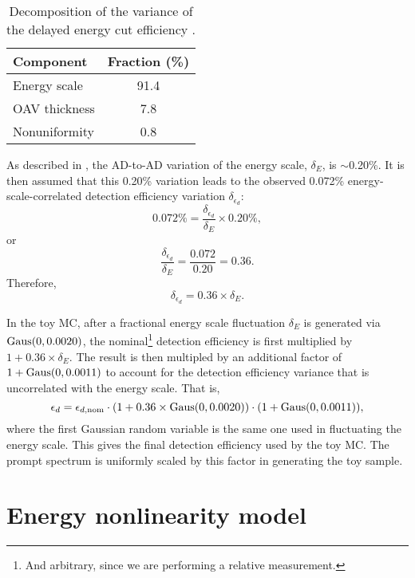 \documentclass[../thesis.tex]{subfiles}
\begin{document}
\begin{table}[ht]
  \begin{tabular}{lc}
    \toprule
    Component & Fraction (\%) \\
    \midrule
    Energy scale & 91.4 \\
    OAV thickness & 7.8 \\
    Nonuniformity & 0.8 \\
    \bottomrule
  \end{tabular}
  \caption{Decomposition of the variance of the delayed energy cut efficiency \cite{loganDetEff}.}
  \label{tab:delayedEffVariance}
\end{table}

As described in \cite[Sec.\@ III B 5 b]{An_2017}, the AD-to-AD variation of the energy scale, $\delta_E$, is $\sim$0.20\%. It is then assumed that this 0.20\% variation leads to the observed 0.072\% energy-scale-correlated detection efficiency variation $\delta_{\epsilon_d}$:
\begin{equation}
  0.072\% = \frac{\delta_{\epsilon_d}}{\delta_E} \times 0.20\%,
\end{equation}
or
\begin{equation}
  \frac{\delta_{\epsilon_d}}{\delta_E} = \frac{0.072}{0.20} = 0.36.
\end{equation}
Therefore,
\begin{equation}
  \delta_{\epsilon_d} = 0.36 \times \delta_E.
\end{equation}

In the toy MC, after a fractional energy scale fluctuation $\delta_E$ is generated via $\operatorname{Gaus}(0, 0.0020)$, the nominal\footnote{And arbitrary, since we are performing a relative measurement.} detection efficiency is first multiplied by $1 + 0.36 \times \delta_E$. The result is then multipled by an additional factor of $1 + \operatorname{Gaus}(0, 0.0011)$ to account for the detection efficiency variance that is uncorrelated with the energy scale. That is,
\begin{equation}
  \epsilon_d = \epsilon_{d,\mathrm{nom}} \cdot (1 + 0.36 \times \operatorname{Gaus}(0, 0.0020)) \cdot (1 + \operatorname{Gaus}(0, 0.0011)),
\end{equation}
where the first Gaussian random variable is the same one used in fluctuating the energy scale. This gives the final detection efficiency used by the toy MC. The prompt spectrum is uniformly scaled by this factor in generating the toy sample.

\section{Energy nonlinearity model}
\label{sec:reconEnergyNLDetails}
\end{document}
